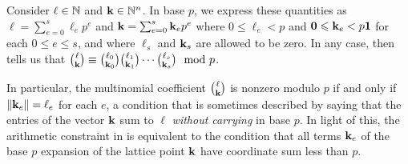 \documentclass{amsart}
\begin{document}
\begin{remark}
   \label{dickson: R}
   Consider $\ell \in \mathbb{N}$ and $\mathbf{k} \in \mathbb{N}^n$.
   In base $p$, we express these quantities as $\ell = \sum_{e=0}^s \ell_e p^e$ and $\mathbf{k}=\sum_{e=0}^s \mathbf{k}_e p^e$ where $0\le \ell_e < p$ and $\mathbf{0}\leqslant\mathbf{k}_e < p  \mathbf{1}$ for each $0 \leq e \leq s$, and where $\ell_s$ and $\mathbf{k}_s$ are allowed to be zero.
   In any case, \cite{dickson.multinomial} then tells us that $\binom{\ell}{\mathbf{k}}\equiv \binom{\ell_0}{\mathbf{k}_0}\binom{\ell_1}{\mathbf{k}_1}\cdots \binom{\ell_s}{\mathbf{k}_s} \mod{p}$.

   In particular, the multinomial coefficient $\binom{\ell}{\mathbf{k}}$ is nonzero modulo $p$ if and only if $\| \mathbf{k}_e \|=\ell_e$ for each $e$, a condition that is sometimes described by saying that the entries of the vector $\mathbf{k}$ sum to $\ell$ \emph{without carrying} in base $p$.
   In light of this, the arithmetic constraint in  is equivalent to the condition that all terms $\mathbf{k}_e$ of the base $p$ expansion of the lattice point $\mathbf{k}$ have coordinate sum less than $p$.
\end{remark}


\end{document}
